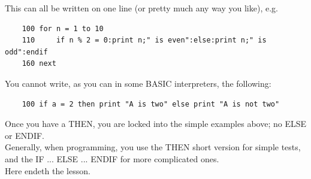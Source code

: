 This can all be written on one line (or pretty much any way you like), e.g. \\

\begin{verbatim}
	100 for n = 1 to 10
	110 	if n % 2 = 0:print n;" is even":else:print n;" is odd":endif
	160 next
\end{verbatim}

You cannot write, as you can in some BASIC interpreters, the following:

\begin{verbatim}
	100 if a = 2 then print "A is two" else print "A is not two"
\end{verbatim}

Once you have a THEN, you are locked into the simple examples above; no ELSE or ENDIF.\\

Generally, when programming, you use the THEN short version for simple tests, and the IF ... ELSE ... ENDIF for more complicated ones.\\

Here endeth the lesson.

